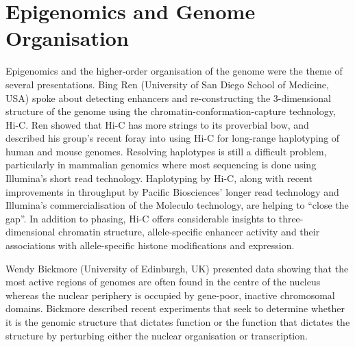 \documentclass[twocolumn]{bmcart}%
\begin{document}




\section*{Epigenomics and Genome Organisation}

Epigenomics and the higher-order organisation of the genome were the theme of several presentations. Bing Ren (University of San Diego School of Medicine, USA) spoke about detecting enhancers and re-constructing the 3-dimensional structure of the genome using the chromatin-conformation-capture technology, Hi-C. Ren showed that Hi-C has more strings to its proverbial bow, and described his group's recent foray into using Hi-C for long-range haplotyping of human and mouse genomes. Resolving haplotypes is still a difficult problem, particularly in mammalian genomics where most sequencing is done using Illumina's short read technology. Haplotyping by Hi-C, along with recent improvements in throughput by Pacific Biosciences' longer read technology and Illumina's commercialisation of the Moleculo technology, are helping to ``close the gap''.  In addition to phasing, Hi-C offers considerable insights to three-dimensional chromatin structure, allele-specific enhancer activity and their associations with allele-specific histone modifications and expression.

Wendy Bickmore (University of Edinburgh, UK) presented data showing that the most active regions of genomes are often found in the centre of the nucleus whereas the nuclear periphery is occupied by gene-poor, inactive chromosomal domains. Bickmore described recent experiments that seek to determine whether it is the genomic structure that dictates function or the function that dictates the structure by perturbing either the nuclear organisation or transcription.
\end{document}
